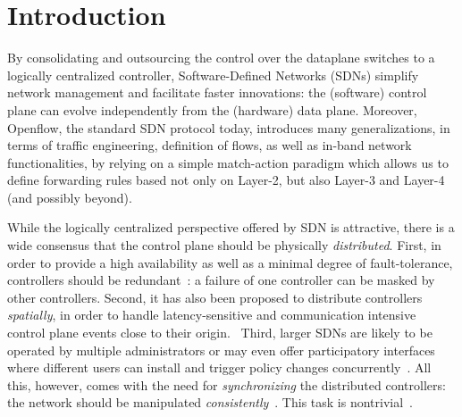 \documentclass[conference]{sigcomm-alternate}
\begin{document}



\section{Introduction}\label{sec:intro}

By consolidating and outsourcing the control over the dataplane switches to a logically
centralized controller, Software-Defined Networks (SDNs)
simplify network management and facilitate faster innovations:
the (software) control plane can evolve independently from the
(hardware) data plane.
Moreover, Openflow, the standard SDN protocol today, introduces many generalizations,
in terms of traffic engineering, definition of flows, as well as in-band network functionalities,
by relying on a simple match-action paradigm which allows us to define
forwarding rules based not only on Layer-2, but also Layer-3 and Layer-4 (and possibly beyond).

While the logically centralized perspective offered by SDN is attractive,
there is a wide consensus that
the control plane should be physically \emph{distributed}.
First, in order to provide a high availability as well as a minimal degree of
fault-tolerance, controllers should be redundant~\cite{onix,stn,onos}: a failure
of one controller can be masked by other controllers. Second, it has also been proposed
to distribute controllers \emph{spatially}, in order to handle latency-sensitive and
communication intensive control plane events close to their origin.~\cite{devoflow,kandoo,jukka,disco}
Third, larger SDNs are likely to be operated by multiple administrators or may even offer
participatory interfaces where different users can install and trigger policy changes
concurrently~\cite{participatory,stn}.
All this, however, comes with the need for \emph{synchronizing}
the distributed controllers:
the network should be manipulated \emph{consistently}~\cite{cpc}.
This task is nontrivial~\cite{cap-theorem}.

\end{document}
